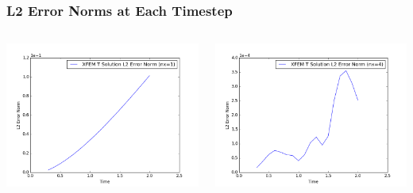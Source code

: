 \documentclass[]{beamer}
\begin{document}
\begin{frame}[t]\frametitle{L2 Error Norms at Each Timestep}
  	\begin{columns}
			\begin{center}
			\includegraphics[scale=0.3]{figures/1D_rz_ls1mat_nx1_L2_Errs}
			\end{center}
			\begin{center}
			\includegraphics[scale=0.3]{figures/1D_rz_ls1mat_nx4_L2_Errs}
			\end{center}
	\end{columns}
\end{frame}
\end{document}
